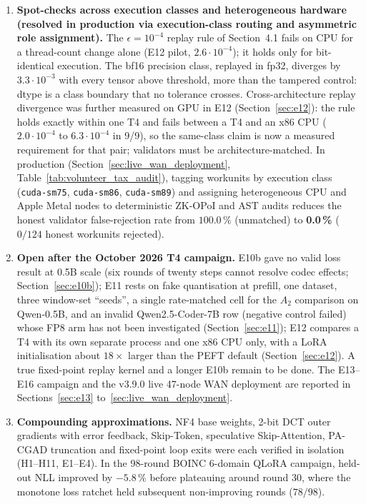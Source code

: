 \documentclass[11pt,a4paper]{article}
\begin{document}
\begin{enumerate}[leftmargin=1.8em]
    \item \textbf{Spot-checks across execution classes and heterogeneous hardware (resolved in production via execution-class routing and asymmetric role assignment).} The $\epsilon = 10^{-4}$ replay rule of Section~4.1 fails on CPU for a thread-count change alone (E12 pilot, $2.6\cdot 10^{-4}$); it holds only for bit-identical execution. The bf16 precision class, replayed in fp32, diverges by $3.3\cdot 10^{-3}$ with every tensor above threshold, more than the tampered control: dtype is a class boundary that no tolerance crosses. Cross-architecture replay divergence was further measured on GPU in E12 (Section~\ref{sec:e12}): the rule holds exactly within one T4 and fails between a T4 and an x86 CPU ($2.0\cdot10^{-4}$ to $6.3\cdot10^{-4}$ in 9/9), so the same-class claim is now a measured requirement for that pair; validators must be architecture-matched. In production (Section~\ref{sec:live_wan_deployment}, Table~\ref{tab:volunteer_tax_audit}), tagging workunits by execution class (\texttt{cuda-sm75}, \texttt{cuda-sm86}, \texttt{cuda-sm89}) and assigning heterogeneous CPU and Apple Metal nodes to deterministic ZK-OPoI and AST audits reduces the honest validator false-rejection rate from $100.0\,\%$ (unmatched) to \textbf{0.0\,\%} ($0/124$ honest workunits rejected).
    \item \textbf{Open after the October 2026 T4 campaign.} E10b gave no valid loss result at 0.5B scale (six rounds of twenty steps cannot resolve codec effects; Section~\ref{sec:e10b}); E11 rests on fake quantisation at prefill, one dataset, three window-set ``seeds'', a single rate-matched cell for the $A_2$ comparison on Qwen-0.5B, and an invalid Qwen2.5-Coder-7B row (negative control failed) whose FP8 arm has not been investigated (Section~\ref{sec:e11}); E12 compares a T4 with its own separate process and one x86 CPU only, with a LoRA initialisation about $18\times$ larger than the PEFT default (Section~\ref{sec:e12}). A true fixed-point replay kernel and a longer E10b remain to be done. The E13--E16 campaign and the v3.9.0 live 47-node WAN deployment are reported in Sections~\ref{sec:e13} to~\ref{sec:live_wan_deployment}.
    \item \textbf{Compounding approximations.} NF4 base weights, 2-bit DCT outer gradients with error feedback, Skip-Token, speculative Skip-Attention, PA-CGAD truncation and fixed-point loop exits were each verified in isolation (H1--H11, E1--E4). In the 98-round BOINC 6-domain QLoRA campaign, held-out NLL improved by $-5.8\,\%$ before plateauing around round 30, where the monotone loss ratchet held subsequent non-improving rounds ($78/98$).

\end{enumerate}
\end{document}
